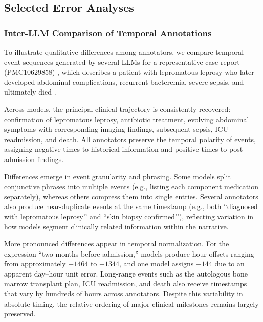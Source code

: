 
\subsection{Selected Error Analyses}\label{ch05:apd:selected-errors}

\ChFiveHeadingOnly

\subsubsection{Inter-LLM Comparison of Temporal Annotations}\label{ch05:apd:inter-llm-comparison}

To illustrate qualitative differences among annotators, we compare temporal event sequences generated by several LLMs for a representative case report (PMC10629858) \citep{abu2023rare}, which describes a patient with lepromatous leprosy who later developed abdominal complications, recurrent bacteremia, severe sepsis, and ultimately died \citep[Supplementary Material: Inter-LLM Comparison of Temporal Annotations]{noroozizadeh-pmoa-tts-v4}.

Across models, the principal clinical trajectory is consistently recovered: confirmation of lepromatous leprosy, antibiotic treatment, evolving abdominal symptoms with corresponding imaging findings, subsequent sepsis, ICU readmission, and death.
All annotators preserve the
temporal polarity of events, assigning negative times to historical information and positive times to post-admission findings.

Differences emerge in event granularity and phrasing.
Some models split conjunctive phrases into multiple events (e.g., listing each component medication separately), whereas others
compress them into single entries.
Several annotators also produce near-duplicate events at the same timestamp (e.g., both “diagnosed with lepromatous leprosy’’ and “skin biopsy confirmed’’), reflecting variation in how models segment clinically related information within the narrative.

More pronounced differences appear in temporal normalization.
For the expression “two months before admission,” models produce hour offsets ranging from approximately $-1464$ to $-1344$, and one model assigns $-144$ due to an apparent day–hour unit error.
Long-range events such as the autologous bone marrow transplant plan, ICU readmission, and death also receive timestamps that vary by hundreds of hours across annotators.
Despite this variability in absolute timing,
the relative ordering of major clinical milestones remains largely preserved.

